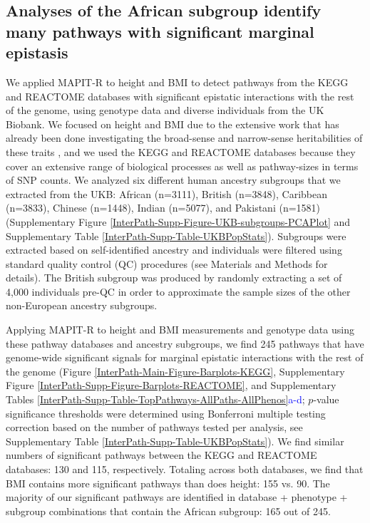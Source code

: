 \documentclass[12pt,a4paper]{article}
\begin{document}
\subsection{Analyses of the African subgroup identify many pathways with significant marginal epistasis}\label{InterPath-Results-PathwayEpistasis}

We applied MAPIT-R to height and BMI to detect pathways from the KEGG and REACTOME databases \citep{Liberzon2011} with significant epistatic interactions with the rest of the genome, using genotype data and diverse individuals from the UK Biobank. We focused on height and BMI due to the extensive work that has already been done investigating the broad-sense and narrow-sense heritabilities of these traits \citep{Yang2010,Elks2012,Visscher2012,Finucane2015,Speed2017,Wainschtein2019}, and we used the KEGG and REACTOME databases because they cover an extensive range of biological processes as well as pathway-sizes in terms of SNP counts. We analyzed six different human ancestry subgroups that we extracted from the UKB: African (n=3111), British (n=3848), Caribbean (n=3833), Chinese (n=1448), Indian (n=5077), and Pakistani (n=1581) (Supplementary Figure \ref{InterPath-Supp-Figure-UKB-subgroups-PCAPlot} and Supplementary Table \ref{InterPath-Supp-Table-UKBPopStats}). Subgroups were extracted based on self-identified ancestry and individuals were filtered using standard quality control (QC) procedures (see Materials and Methods for details). The British subgroup was produced by randomly extracting a set of 4,000 individuals pre-QC in order to approximate the sample sizes of the other non-European ancestry subgroups.

Applying MAPIT-R to height and BMI measurements and genotype data using these pathway databases and ancestry subgroups, we find 245 pathways that have genome-wide significant signals for marginal epistatic interactions with the rest of the genome (Figure \ref{InterPath-Main-Figure-Barplots-KEGG}, Supplementary Figure \ref{InterPath-Supp-Figure-Barplots-REACTOME}, and Supplementary Tables \ref{InterPath-Supp-Table-TopPathways-AllPaths-AllPhenos}\textcolor{blue}{a-d}; $p$-value significance thresholds were determined using Bonferroni multiple testing correction based on the number of pathways tested per analysis, see Supplementary Table \ref{InterPath-Supp-Table-UKBPopStats}). We find similar numbers of significant pathways between the KEGG and REACTOME databases: 130 and 115, respectively. Totaling across both databases, we find that BMI contains more significant pathways than does height: 155 vs. 90. The majority of our significant pathways are identified in database + phenotype + subgroup combinations that contain the African subgroup: 165 out of 245.
\end{document}
